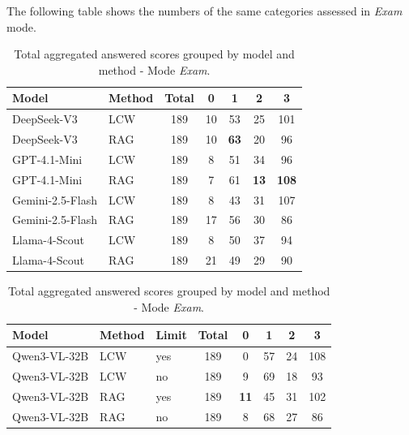 The following table shows the numbers of the same categories assessed in \textit{Exam} mode.

\begin{table}[H]
    \centering
    \caption[Correctness - Answered - Total Numbers - \textit{Exam} Mode]{Total aggregated answered scores grouped by model and method - Mode \textit{Exam}.}
    \label{tab:total_exam_scores_answered}
    
    \begin{threeparttable}
        \small
        \setlength{\tabcolsep}{8pt} %
        \begin{tabular}{llccccc}
            \toprule
            \textbf{Model} & \textbf{Method} & \textbf{Total} & \textbf{0} & \textbf{1} & \textbf{2} & \textbf{3} \\
            \midrule
            DeepSeek-V3 & LCW & 189 & 10 & 53 & 25 & 101 \\
            \rowcolor{gray!10} DeepSeek-V3 & RAG & 189 & 10 & \textbf{63} & 20 & 96 \\
            \addlinespace
            GPT-4.1-Mini & LCW & 189 & 8 & 51 & 34 & 96 \\
            \rowcolor{gray!10} GPT-4.1-Mini & RAG & 189 & 7 & 61 & \textbf{13} & \textbf{108} \\
            \addlinespace
            Gemini-2.5-Flash & LCW & 189 & 8 & 43 & 31 & 107 \\
            \rowcolor{gray!10} Gemini-2.5-Flash & RAG & 189 & 17 & 56 & 30 & 86 \\
            \addlinespace
            Llama-4-Scout & LCW & 189 & 8 & 50 & 37 & 94 \\
            \rowcolor{gray!10} Llama-4-Scout & RAG & 189 & 21 & 49 & 29 & 90 \\
            \bottomrule
        \end{tabular}
    \end{threeparttable}

    \vspace{1.5em}
    
    \begin{threeparttable}
        \small
        \setlength{\tabcolsep}{8pt}
        \begin{tabular}{lllccccc}
            \toprule
            \textbf{Model} & \textbf{Method} & \textbf{Limit} & \textbf{Total} & \textbf{0} & \textbf{1} & \textbf{2} & \textbf{3} \\
            \midrule
            Qwen3-VL-32B & LCW & yes & 189 & 0 & 57 & 24 & 108 \\
            Qwen3-VL-32B & LCW & no & 189 & 9 & 69 & 18 & 93 \\
            \rowcolor{gray!10} Qwen3-VL-32B & RAG & yes & 189 & \textbf{11} & 45 & 31 & 102 \\
            \rowcolor{gray!10} Qwen3-VL-32B & RAG & no & 189 & 8 & 68 & 27 & 86 \\
            \bottomrule
        \end{tabular}
        

\end{threeparttable}
\end{table}
